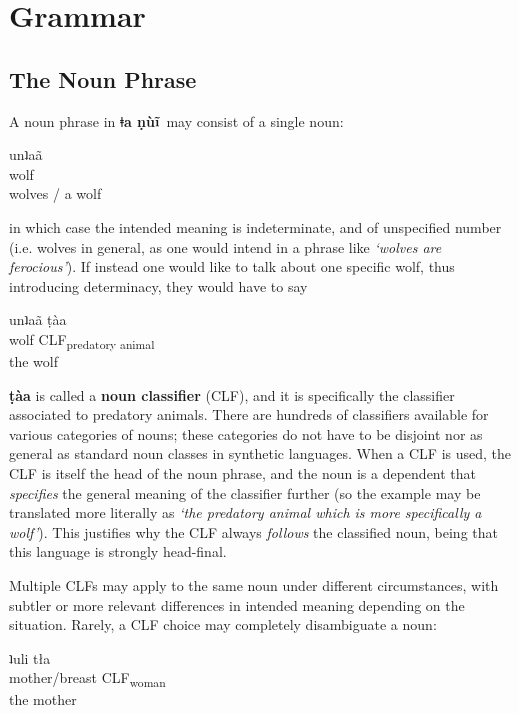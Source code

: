 \documentclass[11pt]{book}
\newcommand{\qcn}[1]{\textbf{#1}}
\newcommand{\langname}{\qcn{ǂa ṇùĩ}~}
\newcommand{\grammsc}[1]{\textsc{#1}}
\newcommand{\CLF}[1]{\grammsc{CLF}\textsubscript{#1}}
\begin{document}
\chapter{Grammar}

\section{The Noun Phrase}

A noun phrase in \langname may consist of a single noun:

\begin{exe}
\ex
\gll unʇaã\\
wolf\\
\glt wolves / a wolf
\end{exe}

in which case the intended meaning is indeterminate, and of unspecified number (i.e. wolves in general, as one would intend in a phrase like \emph{`wolves are ferocious'}). If instead one would like to talk about one specific wolf, thus introducing determinacy, they would have to say

\begin{exe}
\ex
\gll unʇaã ṭàa\\
wolf \CLF{predatory animal}\\
\glt the wolf
\end{exe}

\qcn{ṭàa} is called a \textbf{noun classifier} (CLF), and it is specifically the classifier associated to predatory animals. There are hundreds of classifiers available for various categories of nouns; these categories do not have to be disjoint nor as general as standard noun classes in synthetic languages. When a CLF is used, the CLF is itself the head of the noun phrase, and the noun is a dependent that \emph{specifies} the general meaning of the classifier further (so the example may be translated more literally as \emph{`the predatory animal which is more specifically a wolf'}). This justifies why the CLF always \emph{follows} the classified noun, being that this language is strongly head-final.

Multiple CLFs may apply to the same noun under different circumstances, with subtler or more relevant differences in intended meaning depending on the situation. Rarely, a CLF choice may completely disambiguate a noun:

\begin{exe}
\ex
\gll ʇuli tła\\
mother/breast \CLF{woman}\\
\glt the mother
\end{exe}
\end{document}
